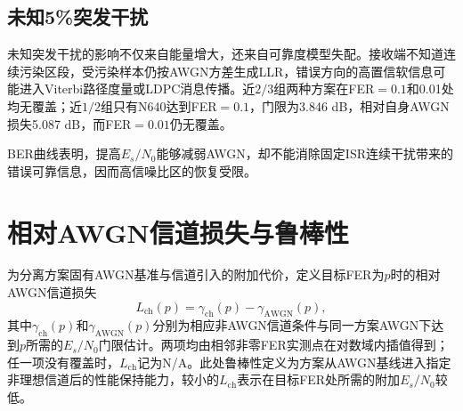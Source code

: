 \subsection{未知5\%突发干扰}

未知突发干扰的影响不仅来自能量增大，还来自可靠度模型失配。接收端不知道连续污染区段，受污染样本仍按AWGN方差生成LLR，错误方向的高置信软信息可能进入Viterbi路径度量或LDPC消息传播。近$2/3$组两种方案在FER$=0.1$和0.01处均无覆盖；近$1/2$组只有N640达到FER$=0.1$，门限为3.846 dB，相对自身AWGN损失5.087 dB，而FER$=0.01$仍无覆盖。

BER曲线表明，提高$E_s/N_0$能够减弱AWGN，却不能消除固定ISR连续干扰带来的错误可靠信息，因而高信噪比区的恢复受限。

\section{相对AWGN信道损失与鲁棒性}

为分离方案固有AWGN基准与信道引入的附加代价，定义目标FER为$p$时的相对AWGN信道损失
\begin{equation}
L_{\mathrm{ch}}(p)=\gamma_{\mathrm{ch}}(p)-\gamma_{\mathrm{AWGN}}(p),
\end{equation}
其中$\gamma_{\mathrm{ch}}(p)$和$\gamma_{\mathrm{AWGN}}(p)$分别为相应非AWGN信道条件与同一方案AWGN下达到$p$所需的$E_s/N_0$门限估计。两项均由相邻非零FER实测点在对数域内插值得到；任一项没有覆盖时，$L_{\mathrm{ch}}$记为N/A。此处鲁棒性定义为方案从AWGN基线进入指定非理想信道后的性能保持能力，较小的$L_{\mathrm{ch}}$表示在目标FER处所需的附加$E_s/N_0$较低。

